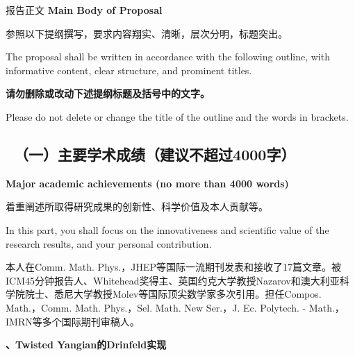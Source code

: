 \documentclass[12pt,UTF8,AutoFakeBold=4,a4paper]{ctexart}
\begin{document}
\begin{center}
{\sanhao {} 报告正文 
\bfseries {} Main Body of Proposal}
\end{center}

{\sihao \kaishu  
参照以下提纲撰写，要求内容翔实、清晰，层次分明，标题突出。}

\bigskip

{\sihao {} The proposal shall be written in accordance with the following outline, with informative content, clear structure, and prominent titles.}

\bigskip

{\sihao \kaishu \color{MsBlue} \bfseries 请勿删除或改动下述提纲标题及括号中的文字。}

\bigskip

{\sihao \color{MsBlue}  Please do not delete or change the title of the outline and the words in brackets.}



{\color{MsBlue} \subsection{\sihao \kaishu \qquad \ 
\textbf{（一）主要学术成绩}{\normalfont（建议不超过4000字）}}}

{\color{MsBlue} \xiaosihao {} 
\textbf{Major academic achievements (no more than 4000 words)}}

{\sihao \kaishu \color{MsBlue} 着重阐述所取得研究成果的创新性、科学价值及本人贡献等。}

{\color{MsBlue} \xiaosihao {} In this part, you shall focus on the innovativeness and scientific value of the research results, and your personal contribution.}

% 
% 


本人在Comm. Math. Phys.，JHEP等国际一流期刊发表和接收了17篇文章。被ICM45分钟报告人、Whitehead奖得主、英国约克大学教授Nazarov和澳大利亚科学院院士、悉尼大学教授Molev等国际顶尖数学家多次引用。担任Compos. Math.，Comm. Math. Phys.，Sel. Math. New Ser.，J. Ec. Polytech. - Math.，IMRN等多个国际期刊审稿人。

\medskip

\textbf{、Twisted Yangian的Drinfeld实现}
\end{document}
